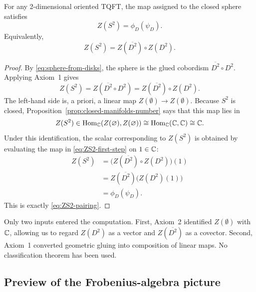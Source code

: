 \begin{proposition}\label{prop:sphere-from-disk-gluing}
For any 2-dimensional oriented TQFT, the map assigned to the closed sphere satisfies
\begin{equation}\label{eq:ZS2-pairing}
Z(S^2) = \phi_D(\psi_D).
\end{equation}
Equivalently,
\begin{equation}\label{eq:ZS2-composition}
Z(S^2) = Z(\overline{D^2}) \circ Z(D^2).
\end{equation}
\end{proposition}

\begin{proof}
By \eqref{eq:sphere-from-disks}, the sphere is the glued cobordism $\overline{D^2} \circ D^2$. Applying Axiom~1 gives
\begin{equation}\label{eq:ZS2-first-step}
Z(S^2) = Z(\overline{D^2} \circ D^2) = Z(\overline{D^2}) \circ Z(D^2).
\end{equation}
The left-hand side is, a priori, a linear map $Z(\emptyset)\to Z(\emptyset)$. Because $S^2$ is closed, Proposition~\ref{prop:closed-manifolds-number} says that this map lies in
\begin{equation}\label{eq:ZS2-homCC}
Z(S^2) \in \operatorname{Hom}_{\mathbb{C}}(Z(\varnothing), Z(\varnothing)) \cong \operatorname{Hom}_{\mathbb{C}}(\mathbb{C},\mathbb{C}) \cong \mathbb{C}.
\end{equation}
Under this identification, the scalar corresponding to $Z(S^2)$ is obtained by evaluating the map in \eqref{eq:ZS2-first-step} on $1 \in \mathbb{C}$:
\begin{align}
Z(S^2)
&= \bigl(Z(\overline{D^2}) \circ Z(D^2)\bigr)(1) \label{eq:ZS2-evaluate-1} \\
&= Z(\overline{D^2})\bigl(Z(D^2)(1)\bigr) \nonumber \\
&= \phi_D(\psi_D). \nonumber
\end{align}
This is exactly \eqref{eq:ZS2-pairing}.
\end{proof}

\begin{remark}\label{rem:which-axioms-disk-gluing}
Only two inputs entered the computation. First, Axiom~2 identified $Z(\emptyset)$ with $\mathbb{C}$, allowing us to regard $Z(D^2)$ as a vector and $Z(\overline{D^2})$ as a covector. Second, Axiom~1 converted geometric gluing into composition of linear maps. No classification theorem has been used.
\end{remark}

\subsection{Preview of the Frobenius-algebra picture}

